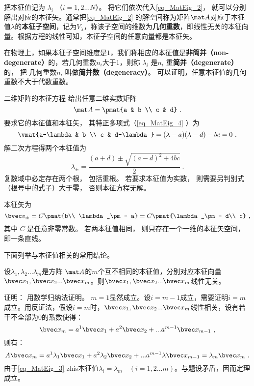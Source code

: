 把本征值记为 $\lambda_i$ （$i = 1, 2\dots N$）。 将它们依次代入\autoref{eq_MatEig_2}， 就可以分别解出对应的本征矢。通常把\autoref{eq_MatEig_2} 的解空间称为矩阵$\mat A$对应于本征值$\lambda$的\textbf{本征子空间}，记为$V_{\lambda}$，称该子空间的维数为\textbf{几何重数}，即线性无关的本征向量。根据方程的线性可知，本征子空间的任意向量都是本征矢。

在物理上，如果本征子空间维度是$1$，我们称相应的本征值是\textbf{非简并（non-degenerate）}的，若几何重数$n_i$大于1，则称 $\lambda_i$  是$n_i$ 重\textbf{简并（degenerate）}的， 把 几何重数$n_i$ 叫做\textbf{简并数（degeneracy）}。
可以证明，任意本征值的几何重数不大于代数重数。


\begin{example}{二维矩阵的本征方程}
给出任意二维实数矩阵
\begin{equation}
\mat A = \pmat{a & b \\ c & d}~.
\end{equation}
要求它的本征值和本征矢， 其特正多项式（\autoref{eq_MatEig_4} ）为
\begin{equation}
\vmat{a-\lambda & b \\ c & d-\lambda} = (\lambda-a)(\lambda-d) - bc = 0~.
\end{equation}
解二次方程得两个本征值为
\begin{equation}
\lambda_\pm = \frac{(a + d) \pm \sqrt{(a-d)^2 + 4bc}}{2}~.
\end{equation}
复数域中必定存在两个根， 包括重根。 若要求本征值为实数， 则需要另判别式（根号中的式子）大于零， 否则本征方程无解。

本征矢为
\begin{equation}
\bvec v_\pm = C\pmat{b\\ \lambda_\pm - a} = C\pmat{\lambda_\pm - d\\ c}~,
\end{equation}
其中 $C$ 是任意非零常数。 若两本征值相同， 则只存在一个一维的本征矢空间， 即一条直线。
\end{example}
下面列举与本征值相关的常用结论。
\begin{theorem}{}\label{the_MatEig_2}
设$\lambda_1,\lambda_2...\lambda_m$是方阵 $\mat A$的$m$个互不相同的本征值，分别对应本征向量$\bvec x_1,\bvec x_2...\bvec x_m$。则$\bvec x_1,\bvec x_2...\bvec x_m$线性无关。
\end{theorem}
证明： 
用数学归纳法证明。
$m=1$显然成立。设$i=m-1$成立，需要证明$i=m$成立。用反证法，假设$i=m$时，$\bvec x_1,\bvec x_2...\bvec x_m$线性相关，设有若干不全部为0的系数使得：
\begin{equation}\label{eq_MatEig_3}
\bvec x_m=a^1\bvec x_1+a^2\bvec x_2+...a^{m-1} \bvec x_{m-1}~,
\end{equation}
则有：
\begin{equation}
 A\bvec x_m=a^1\lambda_1\bvec x_1+a^2\lambda_2\bvec x_2+...a^{m-1}\lambda \bvec x_{m-1}=\lambda_m\bvec x_m~.
\end{equation}
由于\autoref{eq_MatEig_3} zhis本征值$\lambda_i=\lambda_m\quad (i=1,2...m)$。与题设矛盾，因而定理成立。

